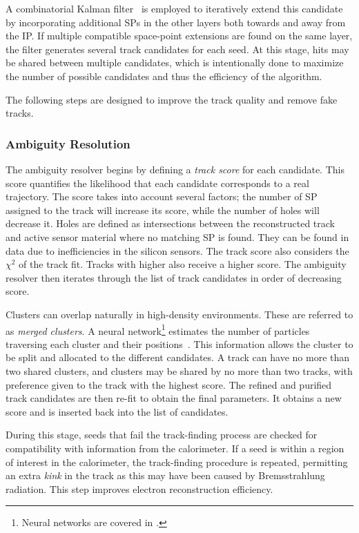 A combinatorial Kalman filter~\cite{ApplicationKalmanFiltering} is employed to iteratively extend this candidate by incorporating additional SPs in the other layers both towards and away from the IP\@.
If multiple compatible space-point extensions are found on the same layer, the filter generates several track candidates for each seed.
At this stage, hits may be shared between multiple candidates, which is intentionally done to maximize the number of possible candidates and thus the efficiency of the algorithm.

The following steps are designed to improve the track quality and remove fake tracks.

\subsubsection{Ambiguity Resolution}

The ambiguity resolver begins by defining a \textit{track score} for each candidate.
This score quantifies the likelihood that each candidate corresponds to a real trajectory.
The score takes into account several factors; the number of SP assigned to the track will increase its score, while the number of holes will decrease it.
Holes are defined as intersections between the reconstructed track and active sensor material where no matching SP is found.
They can be found in data due to inefficiencies in the silicon sensors.
The track score also considers the $\chi^2$ of the track fit.
Tracks with higher \pt also receive a higher score.
The ambiguity resolver then iterates through the list of track candidates in order of decreasing score.

Clusters can overlap naturally in high-density environments.
These are referred to as \textit{merged clusters}.
A neural network\footnote{Neural networks are covered in .} estimates the number of particles traversing each cluster and their positions~\cite{NeuralNetworkClustering}.
This information allows the cluster to be split and allocated to the different candidates.
A track can have no more than two shared clusters, and clusters may be shared by no more than two tracks, with preference given to the track with the highest score.
The refined and purified track candidates are then re-fit to obtain the final parameters.
It obtains a new score and is inserted back into the list of candidates.

During this stage, seeds that fail the track-finding process are checked for compatibility with information from the calorimeter.
If a seed is within a region of interest in the calorimeter, the track-finding procedure is repeated, permitting an extra \textit{kink} in the track as this may have been caused by Bremsstrahlung radiation.
This step improves electron reconstruction efficiency.

